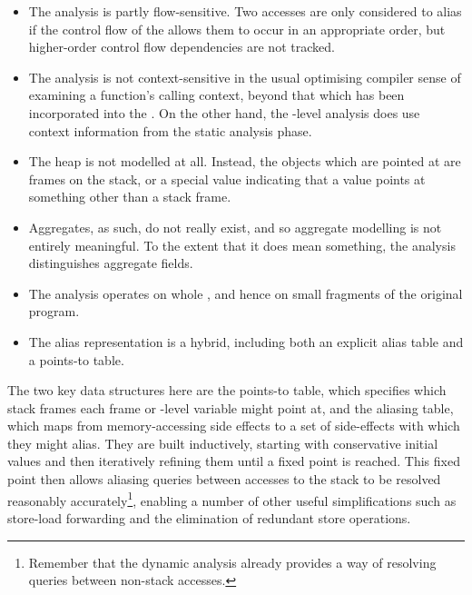 \begin{itemize}
\item
  The analysis is partly flow-sensitive.  Two accesses are only
  considered to alias if the control flow of the {\StateMachine}
  allows them to occur in an appropriate order, but higher-order
  control flow dependencies are not tracked.  
\item
  The analysis is not context-sensitive in the usual optimising
  compiler sense of examining a function's calling context, beyond
  that which has been incorporated into the {\StateMachine}.  On the
  other hand, the {\StateMachine}-level analysis does use context
  information from the static analysis phase.
\item
  The heap is not modelled at all.  Instead, the objects which are
  pointed at are frames on the stack, or a special value indicating
  that a value points at something other than a stack frame.
\item
  Aggregates, as such, do not really exist, and so aggregate modelling
  is not entirely meaningful.  To the extent that it does mean
  something, the analysis distinguishes aggregate fields.
\item
  The analysis operates on whole {\StateMachines}, and hence on small
  fragments of the original program.
\item
  The alias representation is a hybrid, including both an explicit
  alias table and a points-to table. 
\end{itemize}


The two key data structures here are the points-to table, which
specifies which stack frames each frame or {\StateMachine}-level
variable might point at, and the aliasing table, which maps from
memory-accessing side effects to a set of side-effects with which they might alias.  They are built inductively,
starting with conservative
initial values and then iteratively refining them until a fixed point
is reached.  This fixed point then allows aliasing queries between
accesses to the stack to be resolved reasonably
accurately\footnote{Remember that the dynamic analysis already
  provides a way of resolving queries between non-stack accesses.},
enabling a number of other useful simplifications such as store-load
forwarding and the elimination of redundant store operations.

